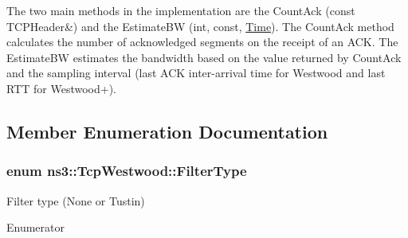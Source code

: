The two main methods in the implementation are the Count\+Ack (const T\+C\+P\+Header\&) and the Estimate\+BW (int, const, \hyperlink{classns3_1_1Time}{Time}). The Count\+Ack method calculates the number of acknowledged segments on the receipt of an A\+CK. The Estimate\+BW estimates the bandwidth based on the value returned by Count\+Ack and the sampling interval (last A\+CK inter-\/arrival time for Westwood and last R\+TT for Westwood+). 

\subsection{Member Enumeration Documentation}
\subsubsection[{\texorpdfstring{Filter\+Type}{FilterType}}]{\setlength{\rightskip}{0pt plus 5cm}enum {\bf ns3\+::\+Tcp\+Westwood\+::\+Filter\+Type}}\hypertarget{classns3_1_1TcpWestwood_a705750d92431a17a9997ad6fbf2918aa}{}\label{classns3_1_1TcpWestwood_a705750d92431a17a9997ad6fbf2918aa}


Filter type (None or Tustin) 

\begin{Desc}
\item[Enumerator]\par
\begin{description}
\item[{\em 
N\+O\+NE\hypertarget{classns3_1_1TcpWestwood_a705750d92431a17a9997ad6fbf2918aaaec226af638268514e4c173c0483421c1}{}\label{classns3_1_1TcpWestwood_a705750d92431a17a9997ad6fbf2918aaaec226af638268514e4c173c0483421c1}
}]\item[{\em 
T\+U\+S\+T\+IN\hypertarget{classns3_1_1TcpWestwood_a705750d92431a17a9997ad6fbf2918aaa57940865dfadfd958171dc42efa5d41e}{}\label{classns3_1_1TcpWestwood_a705750d92431a17a9997ad6fbf2918aaa57940865dfadfd958171dc42efa5d41e}
}]\end{description}
\end{Desc}

